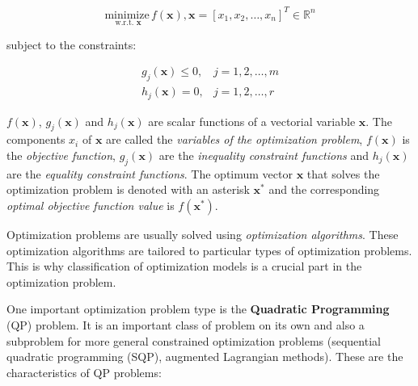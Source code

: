 $$
\underset{\text { w.r.t. } \mathbf{x}}{\text{minimize}} \, f(\mathbf{x}), \mathbf{x}=\left[x_{1}, x_{2}, \ldots, x_{n}\right]^{T} \in \mathbb{R}^{n}
$$

subject  to  the  constraints:

$$
\begin{array}{ll}
    g_{j}(\mathbf{x}) \leq 0, & j=1,2, \ldots, m \\
    h_{j}(\mathbf{x})=0, & j=1,2, \ldots, r
\end{array}
$$

$f(\mathbf{x})$, $g_{j}(\mathbf{x})$ and $h_{j}(\mathbf{x})$ are scalar functions of a vectorial variable $\mathbf{x}$. The components $x_i$ of $\mathbf{x}$ are called the \textit{variables of the optimization problem}, $f(\mathbf{x})$ is the \textit{objective function}, $g_{j}(\mathbf{x})$ are the \textit{inequality constraint functions} and $h_{j}(\mathbf{x})$ are the \textit{equality constraint functions}. The optimum vector $\mathbf{x}$ that solves the optimization problem is denoted with an asterisk $\mathbf{x^{*}}$ and the corresponding \textit{optimal objective function value }is $f(\mathbf{x^{*}})$.

Optimization problems are usually solved using \textit{optimization algorithms}. These optimization algorithms are tailored to particular types of optimization problems. This is why classification of optimization models is a crucial part in the optimization problem.

One important optimization problem type is the \textbf{Quadratic Programming} (QP) problem. It is an important class of problem on its own and also a subproblem for more general constrained optimization problems (sequential quadratic programming (SQP), augmented Lagrangian methods). These are the characteristics of QP problems:

